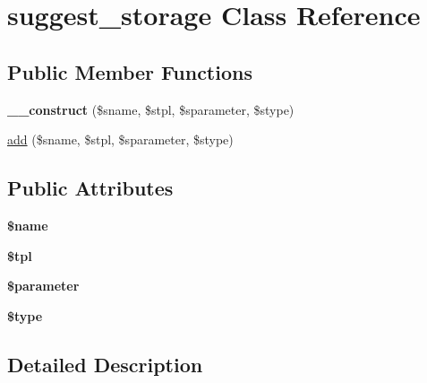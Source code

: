 \hypertarget{classsuggest__storage}{\section{suggest\-\_\-storage Class Reference}
\label{classsuggest__storage}
}
\subsection*{Public Member Functions}
\begin{DoxyCompactItemize}
\item 
\hypertarget{classsuggest__storage_a6734183b048fd2b62eea952b2ac3e71d}{{\bfseries \-\_\-\-\_\-construct} (\$sname, \$stpl, \$sparameter, \$stype)}\label{classsuggest__storage_a6734183b048fd2b62eea952b2ac3e71d}

\item 
\hyperlink{classsuggest__storage_a5abe337940bdac77552b260ead4a6ad7}{add} (\$sname, \$stpl, \$sparameter, \$stype)
\end{DoxyCompactItemize}
\subsection*{Public Attributes}
\begin{DoxyCompactItemize}
\item 
\hypertarget{classsuggest__storage_aeb5f48293d5ddaffd18e11197c6b7939}{{\bfseries \$name}}\label{classsuggest__storage_aeb5f48293d5ddaffd18e11197c6b7939}

\item 
\hypertarget{classsuggest__storage_a45e9dd46cfd034e836a6ae0ede0ed8e7}{{\bfseries \$tpl}}\label{classsuggest__storage_a45e9dd46cfd034e836a6ae0ede0ed8e7}

\item 
\hypertarget{classsuggest__storage_afbf3e3cd12b0b98cacbc789cae598fd0}{{\bfseries \$parameter}}\label{classsuggest__storage_afbf3e3cd12b0b98cacbc789cae598fd0}

\item 
\hypertarget{classsuggest__storage_ad724c08b61b874bafea1294c62797bde}{{\bfseries \$type}}\label{classsuggest__storage_ad724c08b61b874bafea1294c62797bde}

\end{DoxyCompactItemize}


\subsection{Detailed Description}


